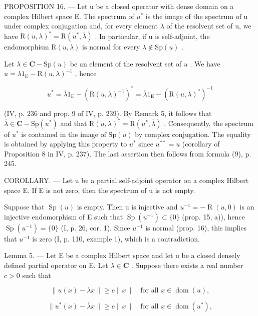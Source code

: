 PROPOSITION 16. --- Let u be a closed operator with dense domain on a complex Hilbert space E. The spectrum of \(u^{*}\) is the image of the spectrum of u under complex conjugation and, for every element \(\lambda\) of the resolvent set of u, we have \(\mathrm{R}(u,\lambda)^{*}=\mathrm{R}(u^{*},\overline{\lambda})\) . In particular, if u is self-adjoint, the endomorphism \(\mathrm{R}(u,\lambda)\) is normal for every \(\lambda\notin\mathrm{Sp}(u)\) .

Let \(\lambda\in\mathbf{C} - \mathrm{Sp}(u)\) be an element of the resolvent set of \(u\) . We have \(u=\lambda1_{\mathrm{E}}-\mathrm{R}(u,\lambda)^{-1}\) , hence

\[
u ^ {*} = \overline {{\lambda}} 1 _ {\mathrm{E}} - (\mathrm{R} (u, \lambda) ^ {- 1}) ^ {*} = \overline {{\lambda}} 1 _ {\mathrm{E}} - (\mathrm{R} (u, \lambda) ^ {*}) ^ {- 1}
\]

(IV, p. 236 and prop. 9 of IV, p. 239). By Remark 5, it follows that \(\overline{\lambda} \in \mathbf{C} - \mathrm{Sp}(u^{*})\) and that \(\mathrm{R}(u, \lambda)^{*} = \mathrm{R}(u^{*}, \overline{\lambda})\) . Consequently, the spectrum of \(u^{*}\) is contained in the image of \(\mathrm{Sp}(u)\) by complex conjugation. The equality is obtained by applying this property to \(u^{*}\) since \(u^{**} = u\) (corollary of Proposition 8 in IV, p. 237). The last assertion then follows from formula (9), p. 245.

COROLLARY. --- Let u be a partial self-adjoint operator on a complex Hilbert space E. If E is not zero, then the spectrum of u is not empty.

Suppose that \(\operatorname{Sp}(u)\) is empty. Then u is injective and \(u^{-1} = -\operatorname{R}(u,0)\) is an injective endomorphism of E such that \(\operatorname{Sp}(u^{-1}) \subset \{0\}\) (prop. 15, a)), hence \(\operatorname{Sp}(u^{-1}) = \{0\}\) (I, p. 26, cor. 1). Since \(u^{-1}\) is normal (prop. 16), this implies that \(u^{-1}\) is zero (I, p. 110, example 1), which is a contradiction.

Lemma 5. --- Let E be a complex Hilbert space and let u be a closed densely defined partial operator on E. Let \(\lambda \in \mathbf{C}\) . Suppose there exists a real number \(c > 0\) such that

\[
\| u (x) - \lambda x \| \geqslant c \| x \| \quad \text{for all } x \in \operatorname{dom} (u),\tag{10}
\]

\[
\| u ^ {*} (x) - \overline {{\lambda}} x \| \geqslant c \| x \| \quad \text{for all } x \in \operatorname{dom} (u ^ {*}),\tag{11}
\]

